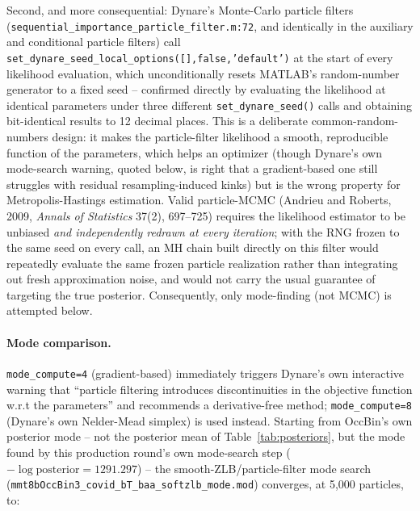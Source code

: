\documentclass[11pt]{article}
\begin{document}
Second, and more consequential: Dynare's Monte-Carlo particle filters
(\texttt{sequential\_importance\_particle\_\allowbreak filter.m:72}, and
identically in the auxiliary and conditional particle filters) call
\texttt{set\_dynare\_seed\_local\_\allowbreak options([],false,'default')}
at the start of every likelihood evaluation, which unconditionally resets
MATLAB's random-number generator to a fixed seed -- confirmed directly by
evaluating the likelihood at identical parameters under three different
\texttt{set\_dynare\_seed()} calls and obtaining bit-identical results to
12 decimal places. This is a deliberate common-random-numbers design: it
makes the particle-filter likelihood a smooth, reproducible function of
the parameters, which helps an optimizer (though Dynare's own mode-search
warning, quoted below, is right that a gradient-based one still struggles
with residual resampling-induced kinks) but is the wrong property for
Metropolis-Hastings estimation. Valid particle-MCMC (Andrieu and Roberts,
2009, \emph{Annals of Statistics} 37(2), 697--725) requires the likelihood
estimator to be unbiased \emph{and independently redrawn at every
iteration}; with the RNG frozen to the same seed on every call, an MH
chain built directly on this filter would repeatedly evaluate the same
frozen particle realization rather than integrating out fresh
approximation noise, and would not carry the usual guarantee of targeting
the true posterior. Consequently, only mode-finding (not MCMC) is
attempted below.

\paragraph{Mode comparison.} \texttt{mode\_compute=4} (gradient-based)
immediately triggers Dynare's own interactive warning that ``particle
filtering introduces discontinuities in the objective function w.r.t the
parameters'' and recommends a derivative-free method; \texttt{mode\_compute=8}
(Dynare's own Nelder-Mead simplex) is used instead. Starting from OccBin's
own posterior mode -- not the posterior mean of
Table~\ref{tab:posteriors}, but the mode found by this production round's
own mode-search step ($-\log\text{posterior}=1291.297$) --
the smooth-ZLB/particle-filter mode search
(\texttt{mmt8bOccBin3\_covid\_bT\_baa\_\allowbreak softzlb\_mode.mod})
converges, at 5{,}000 particles, to:
\end{document}
